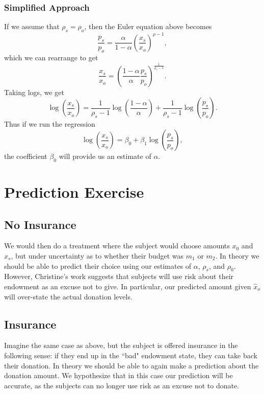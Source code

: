 \documentclass[11pt]{article}
\begin{document}
\subsubsection{Simplified Approach}

If we assume that $\rho_s = \rho_o$, then the Euler equation above becomes 
\[
\frac{p_s}{p_o} =\frac{\alpha}{1-\alpha} \left ( \frac{x_{s}}{x_{o}} \right )^{\rho-1}  ,
\]
which we can rearrange to get
\[
\frac{x_{s}}{x_{o}} = \left ( \frac{1-\alpha}{\alpha}  \frac{p_s}{p_o}\right )^{\frac{1}{\rho_s-1}}.
\]
Taking logs, we get
\[
\log \left ( \frac{x_{s}}{x_{o}} \right ) = \frac{1}{\rho_s-1} \log \left ( \frac{1-\alpha}{\alpha} \right ) + \frac{1}{\rho_s-1}  \log \left (\frac{p_s}{p_o}\right ).
\]
Thus if we run the regression 
\[
\log \left (\frac{x_s}{x_o} \right ) =\beta_0 + \beta_1  \log \left (\frac{p_s}{p_o}\right ),
\]
the coefficient $\beta_0$ will provide us an estimate of $\alpha$.

\section{Prediction Exercise}

\subsection{No Insurance}

We would then do a treatment where the subject would choose amounts $x_0$ and $x_s$, but under uncertainty as to whether their budget was $m_1$ or $m_2$.  In theory we should be able to predict their choice using our estimates of $\alpha$, $\rho_s$, and $\rho_0$.  However, Christine's work suggests that subjects will use risk about their endowment as an excuse not to give.  In particular, our predicted amount given $\hat x_o$ will over-state the actual donation levels.

\subsection{Insurance}

Imagine the same case as above, but the subject is offered insurance in the following sense: if they end up in the ``bad" endowment state, they can take back their donation.  In theory we should be able to again make a prediction about the donation amount.  We hypothesize that in this case our prediction will be accurate, as the subjects can no longer use risk as an excuse not to donate.
\end{document}
